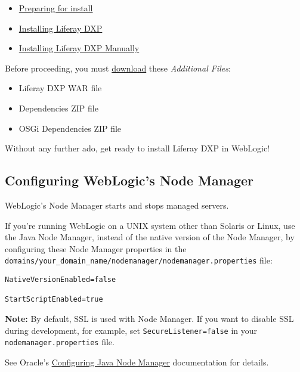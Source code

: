 \begin{itemize}
\tightlist
\item
  \href{/docs/7-0/deploy/-/knowledge_base/d/preparing-for-install}{Preparing
  for install}
\item
  \href{/docs/7-0/deploy/-/knowledge_base/d/installing-product}{Installing
  Liferay DXP}
\item
  \href{/docs/7-0/deploy/-/knowledge_base/d/installing-liferay-manually}{Installing
  Liferay DXP Manually}
\end{itemize}

Before proceeding, you must \href{https://help.liferay.com/hc}{download}
these \emph{Additional Files}:

\begin{itemize}
\tightlist
\item
  Liferay DXP WAR file
\item
  Dependencies ZIP file
\item
  OSGi Dependencies ZIP file
\end{itemize}

Without any further ado, get ready to install Liferay DXP in WebLogic!

\subsection{Configuring WebLogic's Node
Manager}\label{configuring-weblogics-node-manager}

WebLogic's Node Manager starts and stops managed servers.

If you're running WebLogic on a UNIX system other than Solaris or Linux,
use the Java Node Manager, instead of the native version of the Node
Manager, by configuring these Node Manager properties in the
\texttt{domains/your\_domain\_name/nodemanager/nodemanager.properties}
file:

\begin{verbatim}
NativeVersionEnabled=false

StartScriptEnabled=true
\end{verbatim}

\noindent\hrulefill

\textbf{Note:} By default, SSL is used with Node Manager. If you want to
disable SSL during development, for example, set
\texttt{SecureListener=false} in your \texttt{nodemanager.properties}
file.

\noindent\hrulefill

See Oracle's
\href{https://docs.oracle.com/middleware/1212/wls/NODEM/java_nodemgr.htm\#NODEM173}{Configuring
Java Node Manager} documentation for details.

